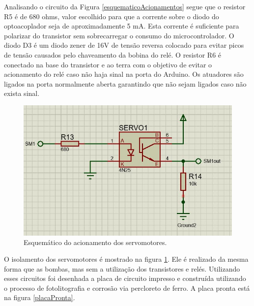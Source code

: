 Analisando o circuito da Figura \ref{esquematicoAcionamentos} segue que o resistor R5 é de 680 ohms, valor escolhido para que a corrente sobre o diodo do optoacoplador seja de aproximadamente 5 mA. Esta corrente é suficiente para polarizar do transistor sem sobrecarregar o consumo do microcontrolador. O diodo D3 é um diodo zener de 16V de tensão reversa colocado para evitar picos de tensão causados pelo chaveamento da bobina do relé. O resistor R6 é conectado na base do transistor e ao terra com o objetivo de evitar o acionamento do relé caso não haja sinal na porta do Arduino. Os atuadores são ligados na porta normalmente aberta garantindo que não sejam ligados caso não exista sinal. 

  \begin{figure}[htb]
	\caption{\label{esquematicoAcionamentos2}Esquemático do acionamento dos servomotores.}
	\begin{center}
	    \includegraphics[width=0.75\linewidth]{./img/esquematicoAcionamento02.jpg}
	\end{center}
\end{figure}

O isolamento dos servomotores é mostrado na figura \ref{esquematicoAcionamentos2}. Ele é realizado da mesma forma que as bombas, mas sem a utilização dos transistores e relés. Utilizando esses circuitos foi desenhada a placa de circuito impresso e construída utilizando o processo de fotolitografia e corrosão via percloreto de ferro. A placa pronta está na figura \ref{placaPronta}.

